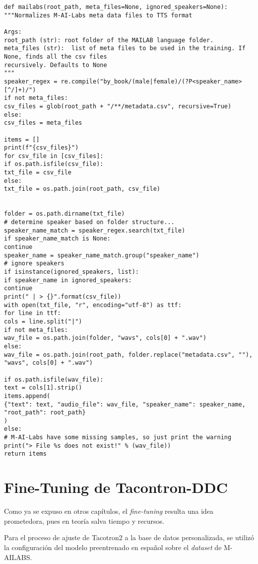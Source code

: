 \lstset{language=Python}
\lstset{frame=lines}
\lstset{basicstyle=\footnotesize}
\begin{lstlisting}
def mailabs(root_path, meta_files=None, ignored_speakers=None):
"""Normalizes M-AI-Labs meta data files to TTS format

Args:
root_path (str): root folder of the MAILAB language folder.
meta_files (str):  list of meta files to be used in the training. If None, finds all the csv files
recursively. Defaults to None
"""
speaker_regex = re.compile("by_book/(male|female)/(?P<speaker_name>[^/]+)/")
if not meta_files:
csv_files = glob(root_path + "/**/metadata.csv", recursive=True)
else:
csv_files = meta_files

items = []
print(f"{csv_files}")
for csv_file in [csv_files]:
if os.path.isfile(csv_file):
txt_file = csv_file
else:
txt_file = os.path.join(root_path, csv_file)


folder = os.path.dirname(txt_file)
# determine speaker based on folder structure...
speaker_name_match = speaker_regex.search(txt_file)
if speaker_name_match is None:
continue
speaker_name = speaker_name_match.group("speaker_name")
# ignore speakers
if isinstance(ignored_speakers, list):
if speaker_name in ignored_speakers:
continue
print(" | > {}".format(csv_file))
with open(txt_file, "r", encoding="utf-8") as ttf:
for line in ttf:
cols = line.split("|")
if not meta_files:
wav_file = os.path.join(folder, "wavs", cols[0] + ".wav")
else:
wav_file = os.path.join(root_path, folder.replace("metadata.csv", ""), "wavs", cols[0] + ".wav")

if os.path.isfile(wav_file):
text = cols[1].strip()
items.append(
{"text": text, "audio_file": wav_file, "speaker_name": speaker_name, "root_path": root_path}
)
else:
# M-AI-Labs have some missing samples, so just print the warning
print("> File %s does not exist!" % (wav_file))
return items
\end{lstlisting}

\section{Fine-Tuning de Tacontron-DDC}
Como ya se expuso en otros capítulos, el \textit{fine-tuning} resulta una idea prometedora, pues en teoría salva tiempo y recursos.

Para el proceso de ajuste de Tacotron2 a la base de datos personalizada, se utilizó la configuración del modelo preentrenado en español sobre el \textit{dataset} de M-AILABS. 

